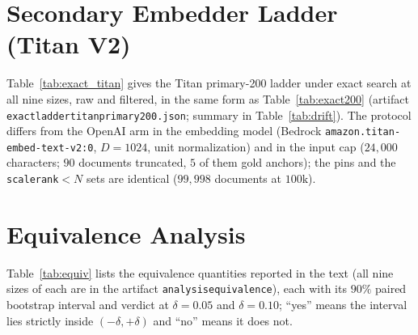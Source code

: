 \documentclass{ieeeaccess}
\makeatletter
\DeclareRobustCommand{\_}{\ifmmode\nfss@text{\textunderscore}\else\textunderscore\allowbreak\fi}
\makeatother
\begin{document}
\section{Secondary Embedder Ladder (Titan V2)}
\label{app:titan}
Table~\ref{tab:exact_titan} gives the Titan primary-200 ladder under exact search at all nine sizes, raw and filtered, in the same form as Table~\ref{tab:exact200} (artifact \texttt{exact\_ladder\_titan\_primary200.json}; summary in Table~\ref{tab:drift}). The protocol differs from the OpenAI arm in the embedding model (Bedrock \texttt{amazon.titan-\allowbreak embed-\allowbreak text-\allowbreak v2:0}, $D{=}1024$, unit normalization) and in the input cap ($24{,}000$ characters; $90$ documents truncated, $5$ of them gold anchors); the pins and the \texttt{scale\_rank}${<}N$ sets are identical ($99{,}998$ documents at $100\text{k}$).



\section{Equivalence Analysis}
\label{app:equiv}
Table~\ref{tab:equiv} lists the equivalence quantities reported in the text (all nine sizes of each are in the artifact \texttt{analysis\_equivalence}), each with its $90\%$ paired bootstrap interval and verdict at $\delta{=}0.05$ and $\delta{=}0.10$; ``yes'' means the interval lies strictly inside $(-\delta,+\delta)$ and ``no'' means it does not.


\end{document}
